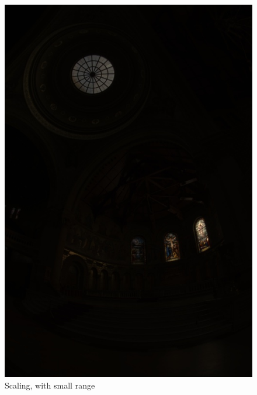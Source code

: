\documentclass{article}
\begin{document}
\begin{figure}[!htb]
      \includegraphics[scale=.27]{./data/1/linscl/mx.jpg}
      \caption{Scaling, with small range}
    \endminipage\hfill

\end{figure}
\end{document}
